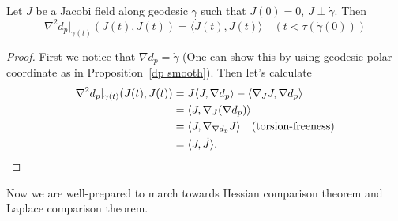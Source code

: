 \begin{prop}
    Let $J$ be a Jacobi field along geodesic $\gamma$ such that $J(0)=0$, $J\perp\dot{\gamma}$.
    Then
    \[\nabla^2d_p|_{\gamma(t)}(J(t),J(t))=\langle\dot{J}(t),J(t)\rangle\quad(t<\tau(\dot{\gamma}(0)))\]
\end{prop}
\begin{proof}
    First we notice that $\nabla d_p=\dot{\gamma}$ (One can show this by using geodesic polar coordinate as in Proposition~\ref{dp smooth}).
    Then let's calculate
    \begin{align*}
        \nabla^2d_p|_{\gamma(t)}(J(t),J(t))&=J\langle J,\nabla d_p\rangle-\langle\nabla_JJ,\nabla d_p\rangle\\
        &=\langle J,\nabla_J(\nabla d_p)\rangle\\
        &=\langle J,\nabla_{\nabla d_p}J\rangle\quad\text{(torsion-freeness)}\\
        &=\langle J,\dot{J}\rangle.\qedhere
    \end{align*}
\end{proof}

Now we are well-prepared to march towards Hessian comparison theorem and Lap\-lace comparison theorem.